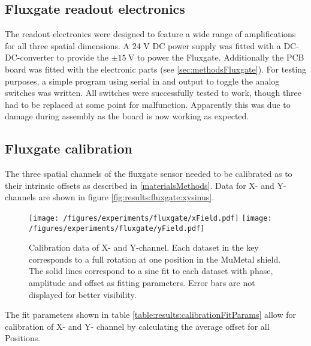     \subsection{Fluxgate readout electronics}
            The readout electronics were designed to feature a wide range of amplifications for all three spatial dimensions. A 24 V DC power supply was fitted with a DC-DC-converter to provide the $\pm\SI{15}{\volt}$ to power the Fluxgate. Additionally the PCB board was fitted with the electronic parts (see \ref{sec:methodsFluxgate}). For testing purposes, a simple program using serial in and output to toggle the analog switches was written. All switches were successfully tested to work, though three had to be replaced at some point for malfunction.  Apparently this was due to damage during assembly as the board is now working as expected.
    \subsection{Fluxgate calibration}
        The three spatial channels of the fluxgate sensor needed to be calibrated as to their intrinsic offsets as described in \ref{materialsMethods}. Data for X- and Y-channels are shown in figure \ref{fig:results:fluxgate:xysinus}.
        \begin{figure}
            \label{fig:results:fluxgate:ysinus}
            \centering
            \texttt{[image: /figures/experiments/fluxgate/xField.pdf]}
            \texttt{[image: /figures/experiments/fluxgate/yField.pdf]}
            \caption[Calibration results X/Y]{Calibration data of X- and Y-channel. Each dataset in the key
            corresponds to a full rotation at one position in the MuMetal shield. The solid lines correspond to
            a sine fit to each dataset with phase, amplitude and offset as fitting parameters. Error bars are not
            displayed for better visibility.}
        \end{figure}
        The fit parameters shown in table \ref{table:results:calibrationFitParams} allow for calibration of X- and Y- channel by calculating the average offset for all Positions.
